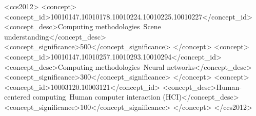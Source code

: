 \documentclass[sigconf,review,anonymous,screen]{acmart}
\begin{document}
\begin{CCSXML}
<ccs2012>
   <concept>
       <concept_id>10010147.10010178.10010224.10010225.10010227</concept_id>
       <concept_desc>Computing methodologies~Scene understanding</concept_desc>
       <concept_significance>500</concept_significance>
       </concept>
   <concept>
       <concept_id>10010147.10010257.10010293.10010294</concept_id>
       <concept_desc>Computing methodologies~Neural networks</concept_desc>
       <concept_significance>300</concept_significance>
       </concept>
   <concept>
       <concept_id>10003120.10003121</concept_id>
       <concept_desc>Human-centered computing~Human computer interaction (HCI)</concept_desc>
       <concept_significance>100</concept_significance>
       </concept>
 </ccs2012>
\end{CCSXML}




\maketitle
\end{document}
